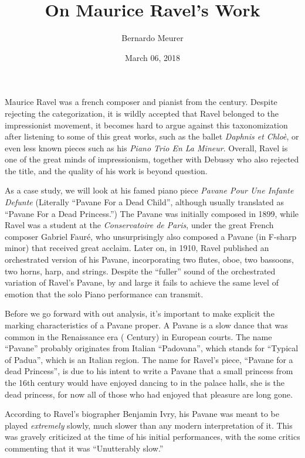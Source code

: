 \documentclass[titlepage,12pt]{article}
\title{On Maurice Ravel's Work}
\date{March 06, 2018}
\author{Bernardo Meurer}
\begin{document}
    \maketitle
    \newpage
    Maurice Ravel was a french composer and pianist from the  century. Despite rejecting the categorization, it is wildly accepted that Ravel belonged to the impressionist movement, it becomes hard to argue against this taxonomization after listening to some of this great works, such as the ballet \textit{Daphnis et Chloè}, or even less known pieces such as his \textit{Piano Trio En La Mineur}. Overall, Ravel is one of the great minds of impressionism, together with Debussy who also rejected the title, and the quality of his work is beyond question.

    As a case study, we will look at his famed piano piece \textit{Pavane Pour Une Infante Defunte} (Literally ``Pavane For a Dead Child'', although usually translated as ``Pavane For a Dead Princess.'') The Pavane was initially composed in 1899, while Ravel was a student at the \textit{Conservatoire de Paris}, under the great French composer Gabriel Fauré, who unsurprisingly also composed a Pavane (in F-sharp minor) that received great acclaim. Later on, in 1910, Ravel published an orchestrated version of his Pavane, incorporating two flutes, oboe, two bassoons, two horns, harp, and strings. Despite the ``fuller'' sound of the orchestrated variation of Ravel's Pavane, by and large it fails to achieve the same level of emotion that the solo Piano performance can transmit.

    Before we go forward with out analysis, it's important to make explicit the marking characteristics of a Pavane proper. A Pavane is a slow dance that was common in the Renaissance era ( Century) in European courts. The name ``Pavane'' probably originates from Italian ``Padovana'', which stands for ``Typical of Padua'', which is an Italian region. The name for Ravel's piece, ``Pavane for a dead Princess'', is due to his intent to write a Pavane that a small princess from the 16th century would have enjoyed dancing to in the palace halls, she is the dead princess, for now all of those who had enjoyed that pleasure are long gone.

    According to Ravel's biographer Benjamin Ivry, his Pavane was meant to be played \emph{extremely} slowly, much slower than any modern interpretation of it. This was gravely criticized at the time of his initial performances, with the some critics commenting that it was ``Unutterably slow.''
\end{document}
